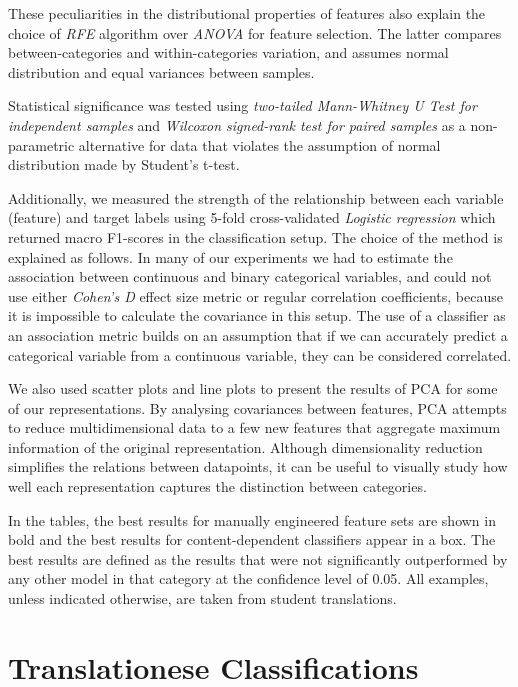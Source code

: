 These peculiarities in the distributional properties of features also explain the choice of \textit{RFE} algorithm over \textit{ANOVA} for feature selection. The latter compares between-categories and within-categories variation, and assumes normal distribution and equal variances between samples.

Statistical significance was tested using \textit{two-tailed Mann-Whitney U Test for independent samples} and \textit{Wilcoxon signed-rank test for paired samples} as a non-parametric alternative for data that violates the assumption of normal distribution made by Student's t-test.

Additionally, we measured the strength of the relationship between each variable (feature) and target labels using 5-fold cross-validated \textit{Logistic regression} which returned macro F1-scores in the classification setup. 
The choice of the method is explained as follows. In many of our experiments we had to estimate the association between continuous and binary categorical variables, and could not use either \textit{Cohen's D} effect size metric or regular correlation coefficients, because it is impossible to calculate the covariance in this setup. The use of a classifier as an association metric builds on an assumption that if we can accurately predict a categorical variable from a continuous variable, they can be considered correlated. 

We also used scatter plots and line plots to present the results of \gls{PCA} for some of our representations. By analysing covariances between features, PCA attempts to reduce multidimensional data to a few new features that aggregate maximum information of the original representation. Although dimensionality reduction simplifies the relations between datapoints, it can be useful to visually study how well each representation captures the distinction between categories. 

In the tables, the best results for manually engineered feature sets are shown in bold and the best results for content-dependent classifiers appear in a box. The best results are defined as the results that were not significantly outperformed by any other model in that category at the confidence level of 0.05. 
All examples, unless indicated otherwise, are taken from student translations. 

\section{\label{sec:detect}Translationese Classifications}


